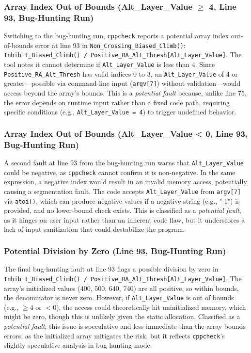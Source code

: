 \documentclass[conference]{IEEEtran}
\begin{document}
\subsubsection{Array Index Out of Bounds (Alt\_Layer\_Value $\geq$ 4, Line 93, Bug-Hunting Run)}
Switching to the bug-hunting run, \texttt{cppcheck} reports a potential array index out-of-bounds error at line 93 in \texttt{Non\_Crossing\_Biased\_Climb()}: \texttt{Inhibit\_Biased\_Climb() / Positive\_RA\_Alt\_Thresh[Alt\_Layer\_Value]}. The tool notes it cannot determine if \texttt{Alt\_Layer\_Value} is less than 4. Since \texttt{Positive\_RA\_Alt\_Thresh} has valid indices 0 to 3, an \texttt{Alt\_Layer\_Value} of 4 or greater—possible via command-line input (\texttt{argv[7]}) without validation—would access beyond the array’s bounds. This is a \textit{potential fault} because, unlike line 75, the error depends on runtime input rather than a fixed code path, requiring specific conditions (e.g., \texttt{Alt\_Layer\_Value = 4}) to trigger undefined behavior.

\subsubsection{Array Index Out of Bounds (Alt\_Layer\_Value < 0, Line 93, Bug-Hunting Run)}
A second fault at line 93 from the bug-hunting run warns that \texttt{Alt\_Layer\_Value} could be negative, as \texttt{cppcheck} cannot confirm it is non-negative. In the same expression, a negative index would result in an invalid memory access, potentially causing a segmentation fault. The code accepts \texttt{Alt\_Layer\_Value} from \texttt{argv[7]} via \texttt{atoi()}, which can produce negative values if a negative string (e.g., "-1") is provided, and no lower-bound check exists. This is classified as a \textit{potential fault}, as it hinges on user input rather than an inherent code flaw, but it underscores a lack of input sanitization that could destabilize the program.

\subsubsection{Potential Division by Zero (Line 93, Bug-Hunting Run)}
The final bug-hunting fault at line 93 flags a possible division by zero in \texttt{Inhibit\_Biased\_Climb() / Positive\_RA\_Alt\_Thresh[Alt\_Layer\_Value]}. The array’s initialized values (400, 500, 640, 740) are all positive, so within bounds, the denominator is never zero. However, if \texttt{Alt\_Layer\_Value} is out of bounds (e.g., $\geq 4$ or $< 0$), the access could theoretically hit uninitialized memory, which might be zero, though this is unlikely given the static allocation. Classified as a \textit{potential fault}, this issue is speculative and less immediate than the array bounds errors, as the initialized array mitigates the risk, but it reflects \texttt{cppcheck}’s slightly speculative analysis in bug-hunting mode.
\end{document}

